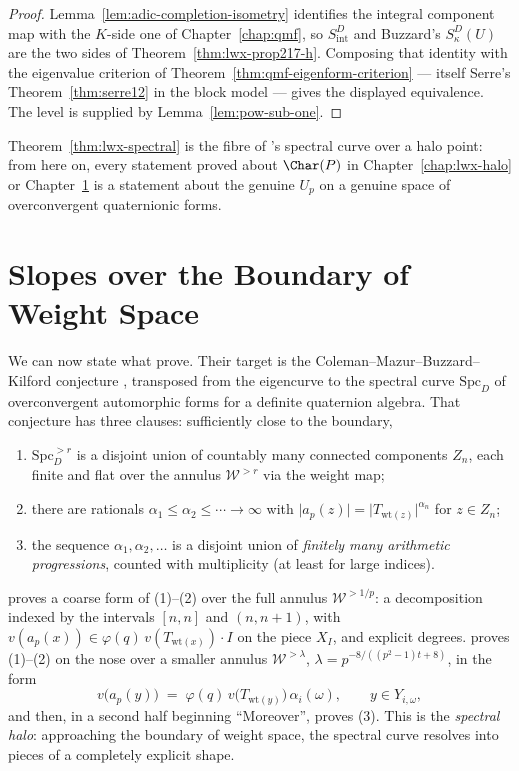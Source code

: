 \begin{proof}
  \leanok
  Lemma~\ref{lem:adic-completion-isometry} identifies the integral component map with the
  $K$-side one of Chapter~\ref{chap:qmf}, so $S^{D}_{\mathrm{int}}$ and Buzzard's
  $S^{D}_{\kappa}(U)$ are the two sides of Theorem~\ref{thm:lwx-prop217-h}.  Composing that
  identity with the eigenvalue criterion of Theorem~\ref{thm:qmf-eigenform-criterion} --- itself
  Serre's Theorem~\ref{thm:serre12} in the block model --- gives the displayed equivalence.  The
  level is supplied by Lemma~\ref{lem:pow-sub-one}.
\end{proof}

Theorem~\ref{thm:lwx-spectral} is the fibre of \cite[Definition 2.13]{LWX}'s spectral curve over
a halo point: from here on, every statement proved about $\Char(P)$ in
Chapter~\ref{chap:lwx-halo} or Chapter~\ref{chap:lwx-slopes} is a statement about the genuine
$U_p$ on a genuine space of overconvergent quaternionic forms.


\chapter{Slopes over the Boundary of Weight Space}
\label{chap:lwx-slopes}

We can now state what \cite{LWX} prove.  Their target is the Coleman--Mazur--Buzzard--Kilford
conjecture \cite[Conjecture 1.2]{LWX}, transposed from the eigencurve to the spectral curve
$\mathrm{Spc}_D$ of overconvergent automorphic forms for a definite quaternion algebra.  That
conjecture has three clauses: sufficiently close to the boundary,
\begin{enumerate}
  \item $\mathrm{Spc}^{>r}_D$ is a disjoint union of countably many connected components $Z_n$,
    each finite and flat over the annulus $\mathcal{W}^{>r}$ via the weight map;
  \item there are rationals $\alpha_1 \leq \alpha_2 \leq \cdots \to \infty$ with
    $\lvert a_p(z)\rvert = \lvert T_{\mathrm{wt}(z)}\rvert^{\alpha_n}$ for $z \in Z_n$;
  \item the sequence $\alpha_1, \alpha_2, \dots$ is a disjoint union of \emph{finitely many
    arithmetic progressions}, counted with multiplicity (at least for large indices).
\end{enumerate}
\cite[Theorem 1.3]{LWX} proves a coarse form of (1)--(2) over the full annulus
$\mathcal{W}^{>1/p}$: a decomposition indexed by the intervals $[n,n]$ and $(n,n+1)$, with
$v(a_p(x)) \in \varphi(q)\,v(T_{\mathrm{wt}(x)})\cdot I$ on the piece $X_I$, and explicit degrees.
\cite[Theorem 1.5]{LWX} proves (1)--(2) on the nose over a smaller annulus
$\mathcal{W}^{>\lambda}$, $\lambda = p^{-8/((p^{2}-1)t+8)}$, in the form
\[
  v\bigl(a_p(y)\bigr) \;=\; \varphi(q)\,v\bigl(T_{\mathrm{wt}(y)}\bigr)\,\alpha_i(\omega),
  \qquad y \in Y_{i,\omega},
  \tag{1.5.1}
\]
and then, in a second half beginning ``Moreover'', proves (3).  This is the \emph{spectral halo}:
approaching the boundary of weight space, the spectral curve resolves into pieces of a completely
explicit shape.

